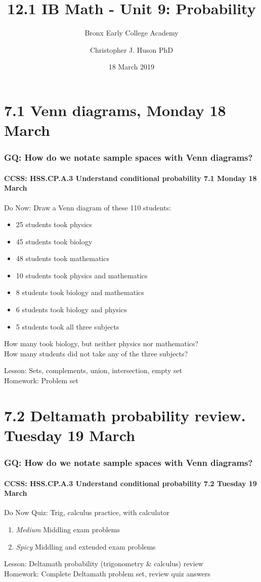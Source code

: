 \documentclass{beamer}
\title{12.1 IB Math - Unit 9: Probability}
\subtitle{Bronx Early College Academy}
\author{Christopher J. Huson PhD}
\date{18 March 2019}
\begin{document}
\frame{\titlepage}

\section[Outline]{}
\frame{\tableofcontents}

\section{7.1 Venn diagrams, Monday 18 March}
  \frame
  {
    \frametitle{GQ: How do we notate sample spaces with Venn diagrams?}
    \framesubtitle{CCSS: HSS.CP.A.3 Understand conditional probability \hfill  \alert{7.1 Monday 18 March}}

    \begin{block}{Do Now: Draw a Venn diagram of these 110 students:}
      \begin{itemize}
        \item 25 students took physics
        \item 45 students took biology
        \item 48 students took mathematics
        \item 10 students took physics and mathematics
        \item 8 students took biology and mathematics
        \item 6 students took biology and physics
        \item 5 students took all three subjects
      \end{itemize}
      How many took biology, but neither physics nor mathematics?\\
      How many students did not take any of the three subjects?
    \end{block}
    Lesson: Sets, complements, union, intersection, empty set \\ \bigskip
    Homework: Problem set
  }

\section{7.2 Deltamath probability review. Tuesday 19 March}
  \frame
  {
    \frametitle{GQ: How do we notate sample spaces with Venn diagrams?}
    \framesubtitle{CCSS: HSS.CP.A.3 Understand conditional probability \hfill \alert{7.2 Tuesday 19 March}}

    \begin{block}{Do Now Quiz: Trig, calculus practice, with calculator}
    \begin{enumerate}
        \item \emph{Medium} Middling exam problems
        \item \emph{Spicy} Middling and extended exam problems
    \end{enumerate}
    \end{block}

    Lesson: Deltamath probability (trigonometry \& calculus) review\\
    Homework: Complete Deltamath problem set, review quiz answers
  }
\end{document}
